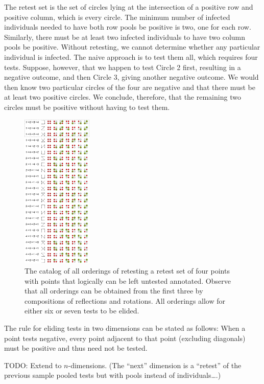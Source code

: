 \documentclass[letterpaper]{article}
\begin{document}
The retest set is the set of circles lying at the intersection of a
positive row and positive column, which is every circle. The minimum
number of infected individuals needed to have both row pools be positive
is two, one for each row. Similarly, there must be at least two infected
individuals to have two column pools be positive. Without retesting, we
cannot determine whether any particular individual is infected. The
naive approach is to test them all, which requires four tests. Suppose,
however, that we happen to test Circle 2 first, resulting in a negative
outcome, and then Circle 3, giving another negative outcome. We would
then know two particular circles of the four are negative and that there
must be at least two positive circles. We conclude, therefore, that the
remaining two circles must be positive without having to test them.



\begin{figure}
	\centering
	\includegraphics[width=0.3\textwidth]{Shortcuts}
	\caption{The catalog of all orderings of retesting a retest set
		of four points with points that logically can be left untested
		annotated. Observe that all orderings can be obtained from the first
		three by compositions of reflections and rotations. All orderings allow
		for either six or seven tests to be elided.}
	\label{fig:shortcuts}
\end{figure}


The rule for eliding tests in two dimensions can be stated as follows:
When a point tests negative, every point adjacent to that point
(excluding diagonals) must be positive and thus need not be tested.

TODO: Extend to $n$-dimensions. (The ``next'' dimension is a
``retest'' of the previous sample pooled tests but with pools instead of
individuals\ldots.)
\end{document}
